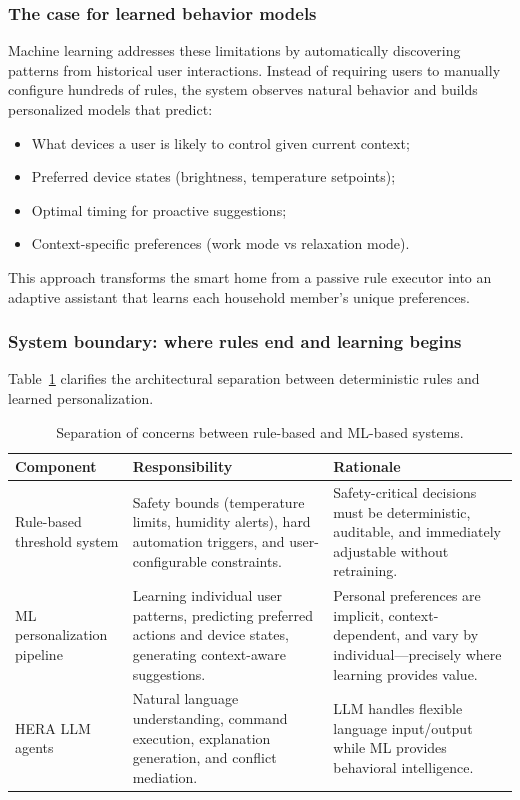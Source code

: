 \subsubsection{The case for learned behavior models}

Machine learning addresses these limitations by automatically discovering
patterns from historical user interactions. Instead of requiring users to
manually configure hundreds of rules, the system observes natural
behavior and builds personalized models that predict:
\begin{itemize}
    \item What devices a user is likely to control given current context;
    \item Preferred device states (brightness, temperature setpoints);
    \item Optimal timing for proactive suggestions;
    \item Context-specific preferences (work mode vs relaxation mode).
\end{itemize}

This approach transforms the smart home from a passive rule executor into
an adaptive assistant that learns each household member's unique
preferences.

\subsubsection{System boundary: where rules end and learning begins}

Table~\ref{tab:rule-ml-boundary} clarifies the architectural separation
between deterministic rules and learned personalization.

\begin{table}[H]
    \centering
    \caption{Separation of concerns between rule-based and ML-based systems.}
    \label{tab:rule-ml-boundary}
    \renewcommand{\arraystretch}{1.2}
    \small
    \begin{tabularx}{\textwidth}{@{} >{\raggedright\arraybackslash}p{3cm} X X @{}}
        \toprule
        \textbf{Component} & \textbf{Responsibility} & \textbf{Rationale} \\
        \midrule
        Rule-based threshold system &
        Safety bounds (temperature limits, humidity alerts), hard automation triggers, and user-configurable constraints. &
        Safety-critical decisions must be deterministic, auditable, and immediately adjustable without retraining. \\
        ML personalization pipeline &
        Learning individual user patterns, predicting preferred actions and device states, generating context-aware suggestions. &
        Personal preferences are implicit, context-dependent, and vary by individual—precisely where learning provides value. \\
        HERA LLM agents &
        Natural language understanding, command execution, explanation generation, and conflict mediation. &
        LLM handles flexible language input/output while ML provides behavioral intelligence. \\
        \bottomrule
    \end{tabularx}
\end{table}

